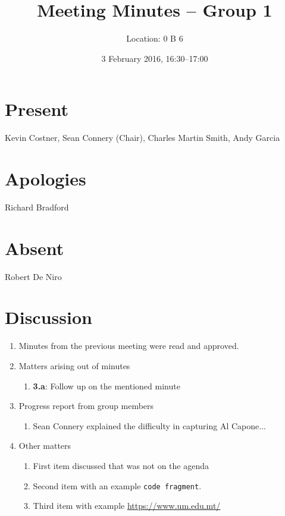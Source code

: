 \documentclass{cce2014-meetings}
\title{Meeting Minutes -- Group 1}
\author{Location: 0 B 6}
\date{3 February 2016, 16:30--17:00}
\begin{document}
\maketitle

\section*{Present}
Kevin Costner,
Sean Connery (Chair),
Charles Martin Smith,
Andy Garcia

\section*{Apologies}
Richard Bradford

\section*{Absent}
Robert De Niro

\section*{Discussion}

\begin{enumerate}


   \item Minutes from the previous meeting were read and approved.

   \item Matters arising out of minutes
         \begin{enumerate}
            \item \textbf{3.a}: Follow up on the mentioned minute
         \end{enumerate}

   \item Progress report from group members
         \begin{enumerate}
            \item Sean Connery explained the difficulty in capturing Al Capone...
         \end{enumerate}


   \item Other matters
         \begin{enumerate}
            \item First item discussed that was not on the agenda
            \item Second item with an example \verb|code fragment|.
            \item Third item with example \url{https://www.um.edu.mt/}
         \end{enumerate}

\end{enumerate}
\end{document}
